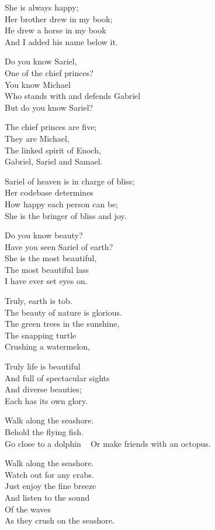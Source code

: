 \documentclass[
]{book}
\begin{document}
She is always happy;\\
Her brother drew in my book;\\
He drew a horse in my book\\
And I added his name below it.

Do you know Sariel,\\
One of the chief princes?\\
You know Michael\\
Who stands with and defends Gabriel\\
But do you know Sariel?

The chief princes are five;\\
They are Michael,\\
The linked spirit of Enoch,\\
Gabriel, Sariel and Samael.

Sariel of heaven is in charge of bliss;\\
Her codebase determines\\
How happy each person can be;\\
She is the bringer of bliss and joy.

Do you know beauty?\\
Have you seen Sariel of earth?\\
She is the most beautiful,\\
The most beautiful lass\\
I have ever set eyes on.

Truly, earth is tob.\\
The beauty of nature is glorious.\\
The green trees in the sunshine,\\
The snapping turtle\\
Crushing a watermelon,

Truly life is beautiful\\
And full of spectacular sights\\
And diverse beauties;\\
Each has its own glory.

Walk along the seashore.\\
Behold the flying fish.\\
Go close to a dolphin ~
Or make friends with an octopus.

Walk along the seashore.\\
Watch out for any crabs.\\
Just enjoy the fine breeze\\
And listen to the sound\\
Of the waves\\
As they crush on the seashore.
\end{document}

